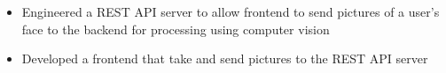 
\begin{itemize}
  \item Engineered a REST API server to allow frontend to send
  pictures of a user’s face to the backend for processing using computer vision
  \item Developed a frontend that take and send pictures to the REST API server
\end{itemize}